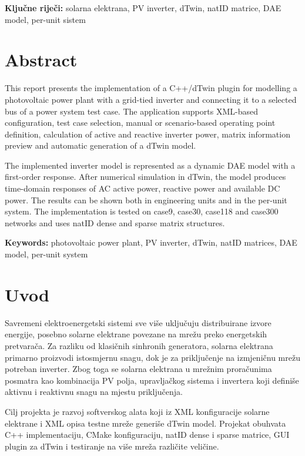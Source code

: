 \documentclass[12pt,a4paper]{article}
\begin{document}
\textbf{Ključne riječi:} solarna elektrana, PV inverter, dTwin, natID matrice, DAE model, per-unit sistem

\section*{Abstract}
This report presents the implementation of a C++/dTwin plugin for modelling a photovoltaic power plant with a grid-tied inverter and connecting it to a selected bus of a power system test case. The application supports XML-based configuration, test case selection, manual or scenario-based operating point definition, calculation of active and reactive inverter power, matrix information preview and automatic generation of a dTwin model.

The implemented inverter model is represented as a dynamic DAE model with a first-order response. After numerical simulation in dTwin, the model produces time-domain responses of AC active power, reactive power and available DC power. The results can be shown both in engineering units and in the per-unit system. The implementation is tested on case9, case30, case118 and case300 networks and uses natID dense and sparse matrix structures.

\textbf{Keywords:} photovoltaic power plant, PV inverter, dTwin, natID matrices, DAE model, per-unit system

\clearpage
\tableofcontents
\clearpage
\listoffigures
\clearpage
\listoftables
\clearpage
{}

\section{Uvod}
Savremeni elektroenergetski sistemi sve više uključuju distribuirane izvore energije, posebno solarne elektrane povezane na mrežu preko energetskih pretvarača. Za razliku od klasičnih sinhronih generatora, solarna elektrana primarno proizvodi istosmjernu snagu, dok je za priključenje na izmjeničnu mrežu potreban inverter. Zbog toga se solarna elektrana u mrežnim proračunima posmatra kao kombinacija PV polja, upravljačkog sistema i invertera koji definiše aktivnu i reaktivnu snagu na mjestu priključenja.

Cilj projekta je razvoj softverskog alata koji iz XML konfiguracije solarne elektrane i XML opisa testne mreže generiše dTwin model. Projekat obuhvata C++ implementaciju, CMake konfiguraciju, natID dense i sparse matrice, GUI plugin za dTwin i testiranje na više mreža različite veličine.
\end{document}
